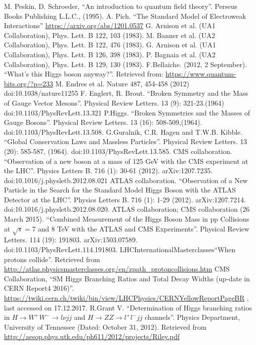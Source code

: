 \documentclass[print]{nuthesis}
\begin{document}
\begin{thebibliography}{300}
 M. Peskin, D. Schroeder, ``An introduction to quantum field theory''. Perseus Books Publishing L.L.C., (1995).  
 A. Pich. ``The Standard Model of Electroweak Interactions'' \url{https://arxiv.org/abs/1201.0537}
G. Arnison et al. (UA1 Collaboration), Phys. Lett. B 122, 103 (1983).
 M. Banner et al. (UA2 Collaboration), Phys. Lett. B 122, 476 (1983).
G. Arnison et al. (UA1 Collaboration), Phys. Lett. B 126, 398 (1983).
P. Bagnaia et al. (UA2 Collaboration), Phys. Lett. B 129, 130 (1983).
 F.Bellaiche. (2012, 2 September). ``What's this Higgs boson anyway?''. Retrieved from: \url{https://www.quantum-bits.org/?p=233} 
 M. Endres et al. Nature 487, 454-458 (2012) doi:10.1038/nature11255
 F. Englert, R. Brout. ``Broken Symmetry and the Mass of Gauge Vector Mesons''. Physical Review Letters. 13 (9): 321-23.(1964) doi:10.1103/PhysRevLett.13.321
 P.Higgs. ``Broken Symmetries and the Masses of Gauge Bosons''. Physical Review Letters. 13 (16): 508-509,(1964). doi:10.1103/PhysRevLett.13.508.
 G.Guralnik, C.R. Hagen  and T.W.B. Kibble. ``Global Conservation Laws and Massless Particles''. Physical Review Letters. 13 (20): 585-587, (1964). doi:10.1103/PhysRevLett.13.585.
 CMS collaboration. ``Observation of a new boson at a mass of 125 GeV with the CMS experiment at the LHC''. Physics Letters B. 716 (1): 30-61 (2012). arXiv:1207.7235. doi:10.1016/j.physletb.2012.08.021
 ATLAS collaboration. ``Observation of a New Particle in the Search for the Standard Model Higgs Boson with the ATLAS Detector at the LHC''. Physics Letters B. 716 (1): 1-29 (2012). arXiv:1207.7214.  doi:10.1016/j.physletb.2012.08.020.
 ATLAS collaboration; CMS collaboration (26 March 2015). ``Combined Measurement of the Higgs Boson Mass in pp Collisions at $\sqrt{s}=7$ and 8 TeV with the ATLAS and CMS Experiments''. Physical Review Letters. 114 (19): 191803. arXiv:1503.07589. doi:10.1103/PhysRevLett.114.191803.
 LHC\@ InternationalMasterclasses``When protons collide''. Retrieved from \url{http://atlas.physicsmasterclasses.org/en/zpath\_protoncollisions.htm}
 CMS Collaboration, ``SM Higgs Branching Ratios and Total Decay Widths (up-date in CERN Report4 2016)''. \url{https://twiki.cern.ch/twiki/bin/view/LHCPhysics/CERNYellowReportPageBR} , last accessed on 17.12.2017.
 R.Grant V. ``Determination of Higgs branching ratios in $H\to W^+W^-\to l\nu jj$ and $H\to ZZ \to l^+l^-jj$ channels''. Physics Department, University of Tennessee (Dated: October 31, 2012). Retrieved from \url{http://aesop.phys.utk.edu/ph611/2012/projects/Riley.pdf}

\end{thebibliography}
\end{document}
